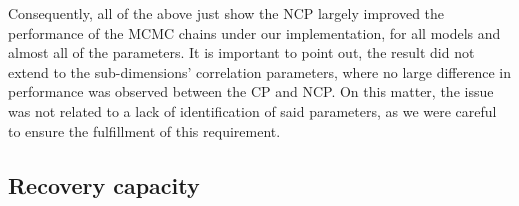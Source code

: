 \begin{comment}
The result appear to be sensible because of two factors, (i) as not only the different sub-dimensions are , but also beacuse the SOLV model was the data generating model.
\end{comment}

Consequently, all of the above just show the NCP largely improved the performance of the MCMC chains under our implementation, for all models and almost all of the parameters. It is important to point out, the result did not extend to the sub-dimensions' correlation parameters, where no large difference in performance was observed between the CP and NCP. On this matter, the issue was not related to a lack of identification of said parameters, as we were careful to ensure the fulfillment of this requirement.


\subsection{Recovery capacity}

